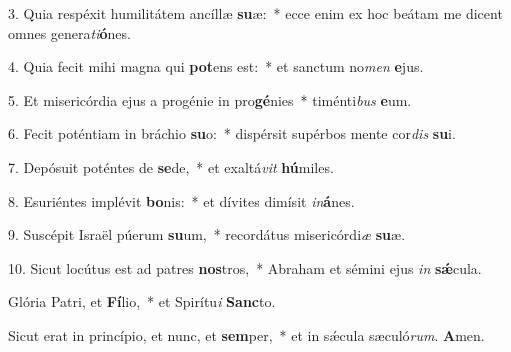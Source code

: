 3. Quia respéxit humilitátem ancíllæ \textbf{su}æ:~*
	ecce enim ex hoc beátam me dicent omnes genera\textit{ti}\textbf{ó}nes.

4. Quia fecit mihi magna qui \textbf{pot}ens est:~*
	et sanctum no\textit{men} \textbf{e}jus.

5. Et misericórdia ejus a progénie in pro\textbf{gé}nies~*
	timénti\textit{bus} \textbf{e}um.

6. Fecit poténtiam in bráchio \textbf{su}o:~*
	dispérsit supérbos mente cor\textit{dis} \textbf{su}i.

7. Depósuit poténtes de \textbf{se}de,~*
	et exaltá\textit{vit} \textbf{hú}miles.

8. Esuriéntes implévit \textbf{bo}nis:~*
	et dívites dimísit \textit{in}\textbf{á}nes.

9. Suscépit Israël púerum \textbf{su}um,~*
	recordátus misericórdi\textit{æ} \textbf{su}æ.

10. Sicut locútus est ad patres \textbf{nos}tros,~*
	Abraham et sémini ejus \textit{in} \textbf{s\'{\ae}}cula.

Glória Patri, et \textbf{Fí}lio,~*
	et Spirítu\textit{i} \textbf{Sanc}to.

Sicut erat in princípio, et nunc, et \textbf{sem}per,~*
	et in s\'{\ae}cula sæculó\textit{rum}. \textbf{A}men.